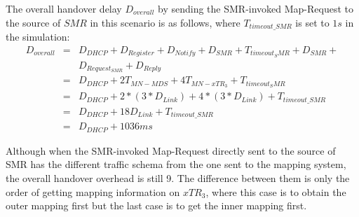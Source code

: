 The overall handover delay $D_{overall}$ by sending the SMR-invoked Map-Request to the source of $SMR$ in this scenario is as follows, where $T_{timeout\_SMR}$ is set to $1 s$ in the simulation:
\begin{eqnarray}
D_{overall} &=& D_{DHCP} + D_{Register} + D_{Notify} + D_{SMR} + T_{timeout_SMR} + D_{SMR} +  \nonumber \\
& & D_{Request_{SMR}} + D_{Reply} \nonumber \\
&=& D_{DHCP} + 2T_{MN-MDS} + 4T_{MN-xTR_3} + T_{timeout_SMR}\nonumber \\
&=& D_{DHCP} + 2* (3*D_{Link}) + 4*(3*D_{Link}) + T_{timeout\_SMR} \nonumber \\
&=& D_{DHCP} + 18D_{Link} + T_{timeout\_SMR}  \\
&=& D_{DHCP} + 1036 ms \nonumber
\end{eqnarray}

Although when the SMR-invoked Map-Request directly sent to the source of SMR has the different traffic schema from the one sent to the mapping system, the overall handover overhead is still 9. The difference between them is only the order of getting mapping information on $xTR_3$, where this case is to obtain the outer mapping first but the last case is to get the inner mapping first.

